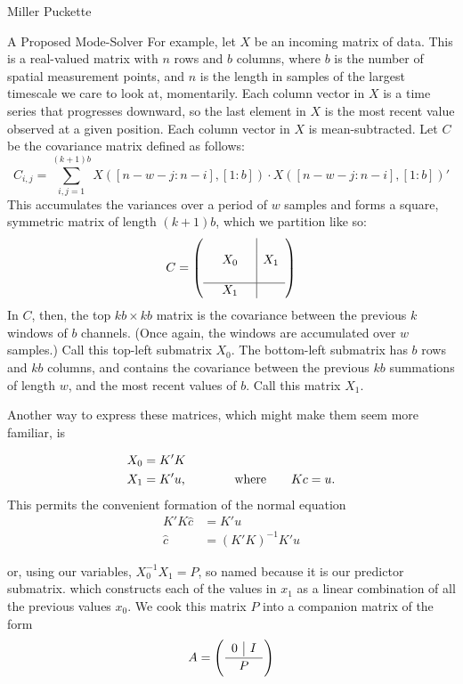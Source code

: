 \documentclass[a4paper,10pt]{report}
\numberwithin{equation}{section}
\begin{document}
\begin{chapter}{Miller Puckette}
\begin{section}{A Proposed Mode-Solver}
For example, let $X$ be an incoming matrix of data. This is a real-valued matrix with $n$ rows and $b$ columns, where $b$ is the number of spatial measurement points, and $n$ is the length in samples of the largest timescale we care to look at, momentarily. Each column vector in $X$ is a time series that progresses downward, so the last element in $X$ is the most recent value observed at a given position. Each column vector in $X$ is mean-subtracted. Let $C$ be the covariance matrix defined as follows:
\begin{equation}\label{covariance_w}
C_{i,j} = \sum_{i,j = 1}^{(k+1)b} X([n - w - j : n - i], [1:b]) \cdot X([n - w - j : n - i], [1:b])'
\end{equation}
This accumulates the variances over a period of $w$ samples and forms a square, symmetric matrix of length $(k+1)b$, which we partition like so:
\begin{equation}\label{covariance_part}
C = \left(
\begin{array}{c c c | c}
 {} & {} & {} &{} \\
 {} & X_0 & {} & X_1 \\
 {} & {} &  {} & {} \\
 \hline
 {} & X_1 & {} & {}
\end{array}
\right)
\end{equation}
In $C$, then, the top $kb \times kb$ matrix is the covariance between the previous $k$ windows of $b$ channels. (Once again, the windows are accumulated over $w$ samples.) Call this top-left submatrix $X_0$. The bottom-left submatrix has $b$ rows and $kb$ columns, and contains the covariance between the previous $kb$ summations of length $w$, and the most recent values of $b$. Call this matrix $X_1$.

Another way to express these matrices, which might make them seem more familiar, is
\begin{singlespace}
\begin{align}
X_0 &= K'K\notag\\
X_1 &= K'u \text{,} \qquad \qquad \text{where} \qquad
Kc = u \text{.} \notag\\
\end{align}
This permits the convenient formation of the normal equation
\begin{align*}
K'K\hat{c} &= K'u\\
\hat{c} &= (K'K)^{-1} K'u
\end{align*}
\end{singlespace}
or, using our variables, $X_0^{-1} X_1 = P$, so named because it is our predictor submatrix. which constructs each of the values in $x_1$ as a linear combination of all the previous values $x_0$. We cook this matrix $P$ into a companion matrix of the form
\begin{equation}\label{companion_part}
A = \left(
\frac{
\begin{array}{ c | c }
 0 &I 
\end{array}
}{P}\right)
\end{equation}


\end{section}
\end{chapter}
\end{document}
